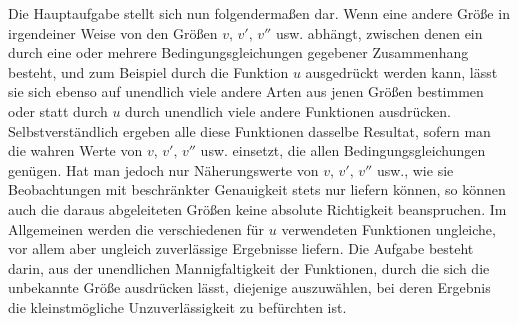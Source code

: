 Die Hauptaufgabe stellt sich nun folgendermaßen dar. Wenn eine andere Größe in irgendeiner Weise von den Größen \(v,\,v',\,v''\) usw. abhängt, zwischen denen ein durch eine oder mehrere Bedingungsgleichungen gegebener Zusammenhang besteht, und zum Beispiel durch die Funktion \(u\) ausgedrückt werden kann, lässt sie sich ebenso auf unendlich viele andere Arten aus jenen Größen bestimmen oder statt durch \(u\) durch unendlich viele andere Funktionen ausdrücken. Selbstverständlich ergeben alle diese Funktionen dasselbe Resultat, sofern man die wahren Werte von \(v,\,v',\,v''\) usw. einsetzt, die allen Bedingungsgleichungen genügen. Hat man jedoch nur Näherungswerte von \(v,\,v',\,v''\) usw., wie sie Beobachtungen mit beschränkter Genauigkeit stets nur liefern können, so %
können auch die daraus abgeleiteten Größen keine absolute Richtigkeit beanspruchen. Im Allgemeinen werden die verschiedenen für \(u\) verwendeten Funktionen ungleiche, vor allem aber ungleich zuverlässige Ergebnisse liefern. Die Aufgabe besteht darin, aus der unendlichen Mannigfaltigkeit der Funktionen, durch die sich die unbekannte Größe ausdrücken lässt, diejenige auszuwählen, bei deren Ergebnis die kleinstmögliche Unzuverlässigkeit zu befürchten ist.

